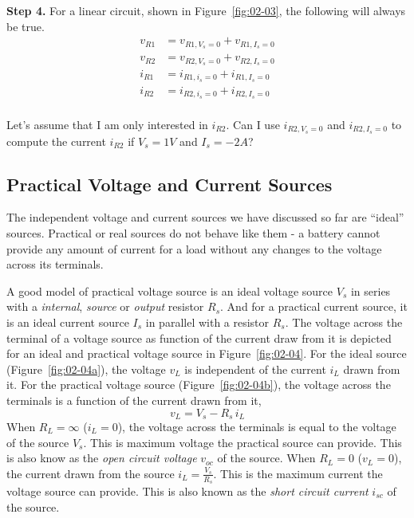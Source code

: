 \noindent\textbf{Step 4.} For a linear circuit, shown in Figure~\ref{fig:02-03}, the following will always be true.
\begin{equation}
    \begin{split}
        v_{R1} &= v_{R1,V_s=0} + v_{R1,I_s=0}\\
        v_{R2} &= v_{R2,V_s=0} + v_{R2,I_s=0}\\
        i_{R1} &= i_{R1,i_s=0} + i_{R1,I_s=0}\\
        i_{R2} &= i_{R2,i_s=0} + i_{R2,I_s=0}\\
    \end{split}
    \label{eq:02-21}
\end{equation}

\noindent Let's assume that I am only interested in $i_{R2}$. Can I use $i_{R2,V_s=0}$ and $i_{R2,I_s=0}$ to compute the current $i_{R2}$ if $V_s = 1V$ and $I_s=-2A$? 

\subsection{Practical Voltage and Current Sources}
The independent voltage and current sources we have discussed so far are ``ideal'' sources. Practical or real sources do not behave like them - a battery cannot provide any amount of current for a load without any changes to the voltage across its terminals.

A good model of practical voltage source is an ideal voltage source $V_s$ in series with a \textit{internal}, \textit{source} or \textit{output} resistor $R_s$. And for a practical current source, it is an ideal current source $I_s$ in parallel with a resistor $R_s$. The voltage across the terminal of a voltage source as function of the current draw from it is depicted for an ideal and practical voltage source in Figure~\ref{fig:02-04}. For the ideal source (Figure~\ref{fig:02-04a}), the voltage $v_L$ is independent of the current $i_L$ drawn from it. For the practical voltage source (Figure~\ref{fig:02-04b}), the voltage across the terminals is a function of the current drawn from it,
\begin{equation}
    v_L = V_s - R_s \, i_L
    \label{eq:02-22}
\end{equation}
When $R_L = \infty$ ($i_L = 0$), the voltage across the terminals is equal to the voltage of the source $V_s$. This is maximum voltage the practical source can provide. This is also know as the \textit{open circuit voltage} $v_{oc}$ of the source. When $R_L = 0$ ($v_L = 0$), the current drawn from the source $i_L = \frac{V_s}{R_s}$. This is the maximum current the voltage source can provide. This is also known as the \textit{short circuit current} $i_{sc}$ of the source.

